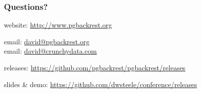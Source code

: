 \documentclass[hyperref={pdfpagelabels=false}]{beamer}
\begin{document}
    \begin{frame}
        \frametitle{Questions?}

        website: \url{http://www.pgbackrest.org}
        \par
        email: \href{mailto:david@pgbackrest.org}{david@pgbackrest.org} \\
        email: \href{mailto:david@crunchydata.com}{david@crunchydata.com}
        \par
        releases: \url{https://github.com/pgbackrest/pgbackrest/releases}
        \par
        slides \& demo: \url{https://github.com/dwsteele/conference/releases}

    \end{frame}
\end{document}
